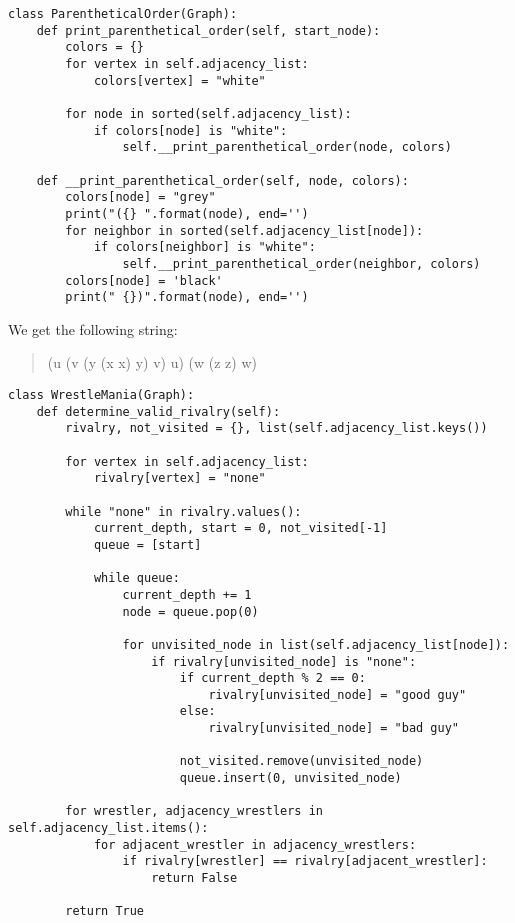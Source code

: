 \documentclass[12pt]{scrartcl}
\begin{document}
\problem{}
\begin{lstlisting}
class ParentheticalOrder(Graph):
    def print_parenthetical_order(self, start_node):
        colors = {}
        for vertex in self.adjacency_list:
            colors[vertex] = "white"

        for node in sorted(self.adjacency_list):
            if colors[node] is "white":
                self.__print_parenthetical_order(node, colors)

    def __print_parenthetical_order(self, node, colors):
        colors[node] = "grey"
        print("({} ".format(node), end='')
        for neighbor in sorted(self.adjacency_list[node]):
            if colors[neighbor] is "white":
                self.__print_parenthetical_order(neighbor, colors)
        colors[node] = 'black'
        print(" {})".format(node), end='')
\end{lstlisting}

We get the following string:

\begin{quote}
    (u (v (y (x x) y) v) u) (w (z z) w)
\end{quote}


\problem{}


\problem{}
\begin{lstlisting}
class WrestleMania(Graph):
    def determine_valid_rivalry(self):
        rivalry, not_visited = {}, list(self.adjacency_list.keys())

        for vertex in self.adjacency_list:
            rivalry[vertex] = "none"

        while "none" in rivalry.values():
            current_depth, start = 0, not_visited[-1]
            queue = [start]

            while queue:
                current_depth += 1
                node = queue.pop(0)

                for unvisited_node in list(self.adjacency_list[node]):
                    if rivalry[unvisited_node] is "none":
                        if current_depth % 2 == 0:
                            rivalry[unvisited_node] = "good guy"
                        else:
                            rivalry[unvisited_node] = "bad guy"

                        not_visited.remove(unvisited_node)
                        queue.insert(0, unvisited_node)

        for wrestler, adjacency_wrestlers in self.adjacency_list.items():
            for adjacent_wrestler in adjacency_wrestlers:
                if rivalry[wrestler] == rivalry[adjacent_wrestler]:
                    return False

        return True
\end{lstlisting}
\end{document}

